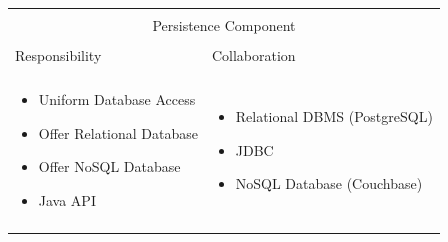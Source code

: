 \begin{tabular}{|l|l|}
    \cline{1-2}
    \multicolumn{2}{|c|}{} \\[-0.3cm]
    \multicolumn{2}{|c|}{Persistence Component} \\ 
    \multicolumn{2}{|c|}{} \\[-0.3cm]
    \cline{1-2}
    Responsibility & Collaboration \\
    \cline{1-2}
    & \\[-0.2cm]
    \begin{minipage}{6.5cm}
        \begin{itemize}
          \item Uniform Database Access
          \item Offer Relational Database 
          \item Offer NoSQL Database
          \item Java API
        \end{itemize} 
    \end{minipage}
	&
    \begin{minipage}{6.5cm}
        \begin{itemize}
          \item Relational DBMS (PostgreSQL)
          \item JDBC
          \item NoSQL Database (Couchbase)
        \end{itemize} 
    \end{minipage}
	\\ & \\
    \hline
\end{tabular}

\vspace{0.5cm}

